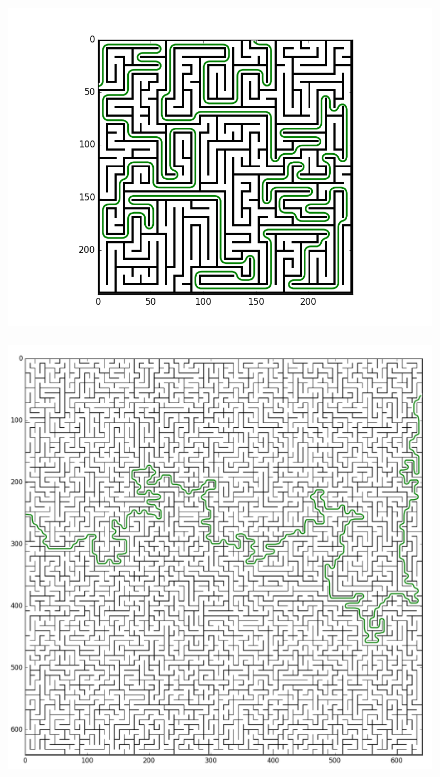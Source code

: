 \documentclass{article}
\begin{document}
 \begin{figure}
 	\begin{center}
 		\includegraphics[scale=0.6]{../result/maze3_C.png}
 	\end{center}
 \end{figure}
 \begin{figure}
 	\begin{center}
 		\includegraphics[scale=0.3]{../result/maze5_C10.png}
 	\end{center}
 \end{figure}
\end{document}

